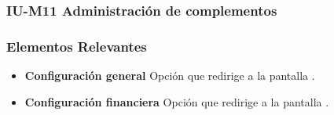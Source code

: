 \subsubsection{IU-M11 Administración de complementos}



\subsubsection{Elementos Relevantes}

    \begin{itemize}
        \item {\bf Configuración general}
            Opción que redirige a la pantalla .
        \item {\bf Configuración financiera}
            Opción que redirige a la pantalla .
    \end{itemize}


\clearpage

